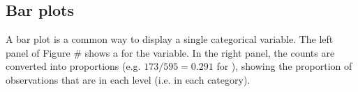 \begin{doublespace}

\textC{\newpage}

\subsection{Bar plots}
A bar plot is a common way to display a single categorical variable. The left panel of Figure \# shows a  for the  variable. In the right panel, the counts are converted into proportions (e.g. $173/595=0.291$ for ), showing the proportion of observations that are in each level (i.e. in each category).


\end{doublespace}
